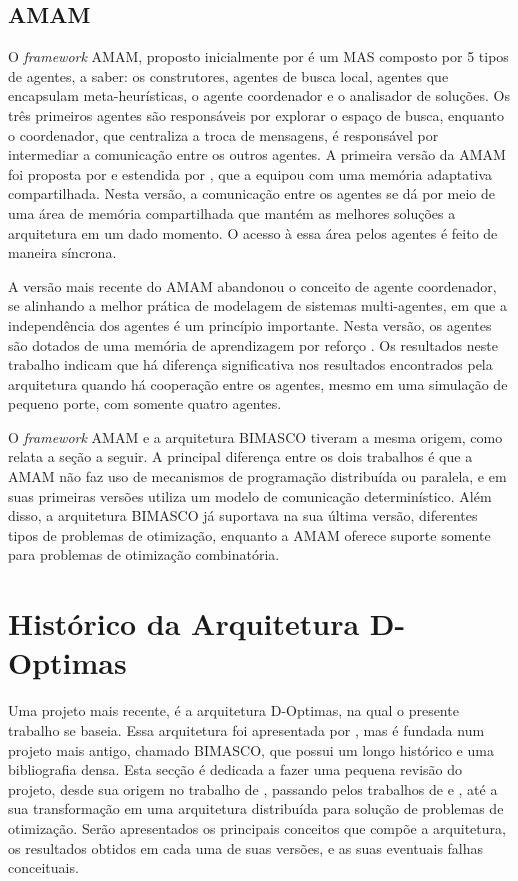 \subsection{AMAM}
O \textit{framework} AMAM, proposto inicialmente por  é um MAS composto por 5 tipos de agentes, a saber: os construtores, agentes de busca local, agentes que encapsulam meta-heurísticas, o agente coordenador e o analisador de soluções. Os três primeiros agentes são responsáveis por explorar o espaço de busca, enquanto o coordenador, que centraliza a troca de mensagens, é responsável por intermediar a comunicação entre os outros agentes. A primeira versão da AMAM foi proposta por  e estendida por , que a equipou com uma memória adaptativa compartilhada. Nesta versão, a comunicação entre os agentes se dá por meio de uma área de memória compartilhada que mantém as melhores soluções a arquitetura em um dado momento. O acesso à essa área pelos agentes é feito de maneira síncrona.  

A versão mais recente do AMAM abandonou o conceito de agente coordenador, se alinhando a melhor prática de modelagem de sistemas multi-agentes, em que a independência dos agentes é um princípio importante. Nesta versão, os agentes são dotados de uma memória de aprendizagem por reforço \cite{silva2015}. Os resultados neste trabalho indicam que há diferença significativa nos resultados encontrados pela arquitetura quando há  cooperação entre os agentes, mesmo em uma simulação de pequeno porte, com somente quatro agentes.

O \textit{framework} AMAM e a arquitetura BIMASCO tiveram a mesma origem, como relata a seção a seguir. A principal diferença entre os dois trabalhos é que a AMAM não faz uso de mecanismos de programação distribuída ou paralela, e em suas primeiras versões utiliza um modelo de comunicação determinístico. Além disso, a arquitetura BIMASCO já suportava na sua última versão, diferentes tipos de problemas de otimização, enquanto a AMAM  oferece suporte somente para problemas de otimização combinatória.

\section{Histórico da Arquitetura D-Optimas}
\label{sec:histBimasco}

Uma projeto mais recente, é a arquitetura D-Optimas, na qual o presente trabalho se baseia. Essa arquitetura foi apresentada por , mas é fundada num projeto mais antigo, chamado BIMASCO, que possui um longo histórico e uma bibliografia densa. Esta secção é dedicada a fazer uma pequena revisão do projeto, desde sua origem no trabalho de , passando pelos trabalhos de  e , até a sua transformação em uma arquitetura distribuída para solução de problemas de otimização. Serão apresentados os principais conceitos que compõe a arquitetura, os resultados obtidos em cada uma de suas versões, e as suas eventuais falhas conceituais.

